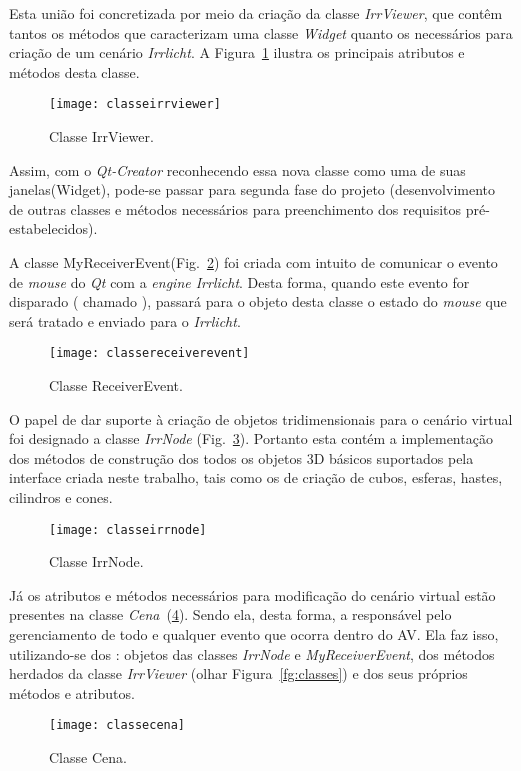 	Esta união foi concretizada por meio da criação da classe \textit{IrrViewer}, que contêm tantos os métodos que caracterizam uma classe \textit{Widget} quanto os necessários para criação de um cenário \textit{Irrlicht}. A Figura~\ref{fg:classeirrviewer} ilustra os principais atributos e métodos desta classe.
\begin{figure}[!ht]
	\centering
	\texttt{[image: classeirrviewer]}
	\caption{Classe IrrViewer.}
	\label{fg:classeirrviewer}
\end{figure}

	Assim, com o \textit{Qt-Creator} reconhecendo essa nova classe como uma de suas janelas(Widget), pode-se passar para segunda fase do projeto (desenvolvimento de outras classes e métodos necessários para preenchimento dos requisitos pré-estabelecidos).

	A classe MyReceiverEvent(Fig.~\ref{fg:classereceiverevent}) foi criada com intuito de comunicar o  evento de \textit{mouse} do \textit{Qt} com a \textit{engine Irrlicht}. Desta forma, quando este evento for disparado ( chamado ), passará para o objeto desta classe o estado do \textit{mouse} que será tratado e enviado para o \textit{Irrlicht}. 
\begin{figure}[!ht]
	\centering
	\texttt{[image: classereceiverevent]}
	\caption{Classe ReceiverEvent.}
	\label{fg:classereceiverevent}
\end{figure}

	O papel de dar suporte à criação de objetos tridimensionais para o cenário virtual foi designado a classe \textit{IrrNode} (Fig.~\ref{fg:classeirrnode}). Portanto esta contém a implementação dos métodos de construção dos todos os objetos 3D básicos suportados pela interface criada neste trabalho, tais como os de criação de cubos, esferas, hastes, cilindros e cones.
\begin{figure}[!ht]
	\centering
	\texttt{[image: classeirrnode]}
	\caption{Classe IrrNode.}
	\label{fg:classeirrnode}
\end{figure}

	Já os atributos e métodos necessários para modificação do cenário virtual estão presentes na classe \textit{Cena}~(\ref{fg:classecena}). Sendo ela, desta forma, a responsável pelo gerenciamento de todo e qualquer evento que ocorra dentro do AV. Ela faz isso, utilizando-se dos : objetos das classes \textit{IrrNode} e \textit{MyReceiverEvent}, dos métodos herdados da classe \textit{IrrViewer} (olhar Figura~\ref{fg:classes}) e dos seus próprios métodos e atributos. 
\begin{figure}[!ht]
	\centering
	\texttt{[image: classecena]}
	\caption{Classe Cena.}
	\label{fg:classecena}
\end{figure}

